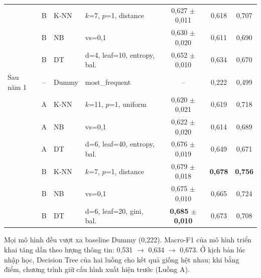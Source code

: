 \documentclass[12pt,a4paper,oneside]{report}
\newcommand{\fone}{Macro-F1}
\begin{document}
{\begin{xltabular}{\textwidth}{@{}l c l >{\raggedright\arraybackslash}X c c c@{}}
 & B & K-NN & $k$=7, $p$=1, distance & 0,627 $\pm$ 0,011 & 0,618 & 0,707\\
 & B & NB & vs=0,1 & 0,630 $\pm$ 0,020 & 0,611 & 0,690\\
 & B & DT & d=4, leaf=10, entropy, bal. & 0,652 $\pm$ 0,010 & 0,634 & 0,670\\
\midrule
Sau năm 1 & -- & Dummy & most\_frequent & -- & 0,222 & 0,499\\
 & A & K-NN & $k$=11, $p$=1, uniform & 0,620 $\pm$ 0,021 & 0,619 & 0,718\\
 & A & NB & vs=0,1 & 0,622 $\pm$ 0,020 & 0,614 & 0,689\\
 & A & DT & d=6, leaf=40, entropy, bal. & 0,676 $\pm$ 0,019 & 0,649 & 0,671\\
 & B & K-NN & $k$=7, $p$=1, distance & 0,679 $\pm$ 0,018 & \textbf{0,678} & \textbf{0,756}\\
 & B & NB & vs=0,1 & 0,675 $\pm$ 0,010 & 0,665 & 0,724\\
 & B & DT & d=6, leaf=20, gini, bal. & \textbf{0,685 $\pm$ 0,010} & 0,673 & 0,708\\
\end{xltabular}}

Mọi mô hình đều vượt xa baseline Dummy (0,222). \fone{} của mô hình triển khai tăng dần theo lượng thông tin:
0,531 $\rightarrow$ 0,634 $\rightarrow$ 0,673. Ở kịch bản lúc nhập học, Decision Tree của hai luồng cho kết quả giống hệt
nhau; khi bằng điểm, chương trình giữ cấu hình xuất hiện trước (Luồng A).
\end{document}
